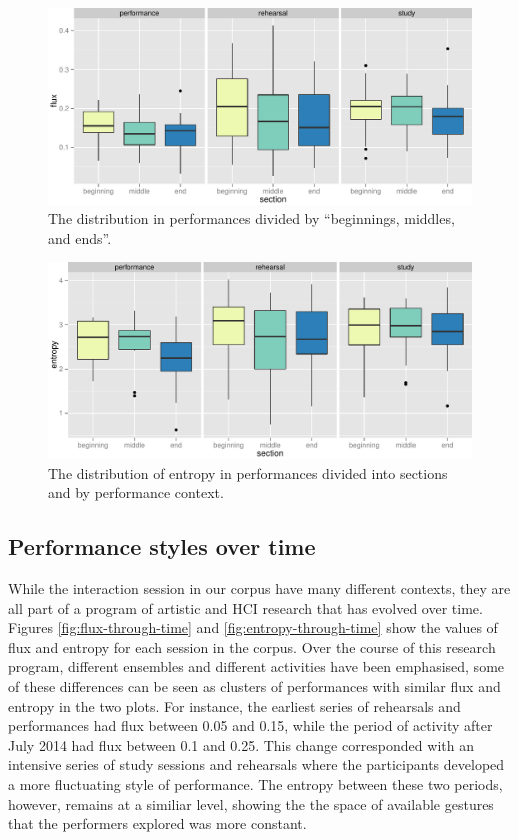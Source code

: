 \documentclass{sigchi}
\begin{document}

\begin{figure}
  \centering
  \includegraphics[width=\linewidth]{figures/context-section-flux}
  \caption{The distribution in performances divided by ``beginnings,
    middles, and ends''.
    \label{fig:context-section-flux}}
\end{figure}

\begin{figure}
  \centering
  \includegraphics[width=\linewidth]{figures/context-section-entropy}
  \caption{The distribution of entropy in performances divided into
    sections and by performance context.
    \label{fig:context-section-entropy}}
\end{figure}



\subsection{Performance styles over time}

While the interaction session in our corpus have many different
contexts, they are all part of a program of artistic and HCI research
that has evolved over time. Figures \ref{fig:flux-through-time} and
\ref{fig:entropy-through-time} show the values of flux and entropy for
each session in the corpus. Over the course of this research program,
different ensembles and different activities have been emphasised,
some of these differences can be seen as clusters of performances with
similar flux and entropy in the two plots. For instance, the earliest
series of rehearsals and performances had flux between 0.05 and 0.15,
while the period of activity after July 2014 had flux between 0.1 and
0.25. This change corresponded with an intensive series of study
sessions and rehearsals where the participants developed a more
fluctuating style of performance. The entropy between these two
periods, however, remains at a similiar level, showing the the space
of available gestures that the performers explored was more constant.
\end{document}
